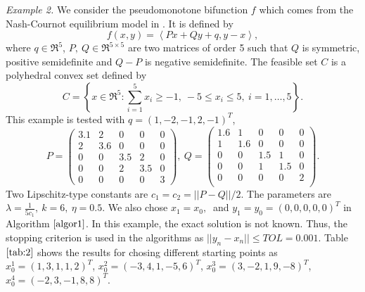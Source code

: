 \documentclass{aims}
\theoremstyle{definition}
\begin{document}
\textit{Example 2.} We consider the pseudomonotone bifunction $f$ which comes from the Nash-Cournot equilibrium model in \cite{QMH2008,SVH2011}. 
It is defined by 
$$ f(x,y)=\left\langle Px+Qy+q,y-x\right\rangle, $$
where $q\in \Re^5$, $P,~Q\in \Re^{5\times 5}$ are two matrices of order 5 such that $Q$ is symmetric, positive semidefinite and $Q-P$ is 
negative semidefinite. The feasible set $C$ is a polyhedral convex set defined by 
$$ C=\left\{x\in \Re^5:\sum_{i=1}^5 x_i\ge -1,~-5\le x_i\le 5,~i=1,\ldots,5\right\}. $$
This example is tested with $q=(1,-2,-1,2,-1)^T$,
$$
    P =
    \left(\begin{array}{ccccc}
     3.1&2&0&0&0 \\
     2&3.6&0&0&0\\
0&0&3.5&2&0\\
0&0&2&3.5&0\\
0&0&0&0&3
    \end{array}\right),~
Q =
    \left(\begin{array}{ccccc}
     1.6&1&0&0&0 \\
     1&1.6&0&0&0\\
0&0&1.5&1&0\\
0&0&1&1.5&0\\
0&0&0&0&2\\
    \end{array}\right).
$$
Two Lipschitz-type constants are $c_1=c_2=||P-Q||/2$. The parameters are $\lambda=\frac{1}{5c_1},~k=6,~\eta=0.5$. 
We also chose $x_1=x_0,~$ and $y_1=y_0=(0,0,0,0,0)^T$ in Algorithm $\ref{algor1}$. In this example, the exact solution 
is not known. Thus, the stopping criterion is used in the algorithms as $||y_n-x_n||\le TOL=0.001$. Table $\ref{tab:2}$ shows 
the results for chosing different starting points as $ x_0^1=(1,3,1,1,2)^T$, $ x_0^2=(-3,4,1,-5,6)^T$, $ x_0^3=(3,-2,1,9,-8)^T $, 
$ x_0^4=(-2,3,-1,8,8)^T $.
\end{document}
